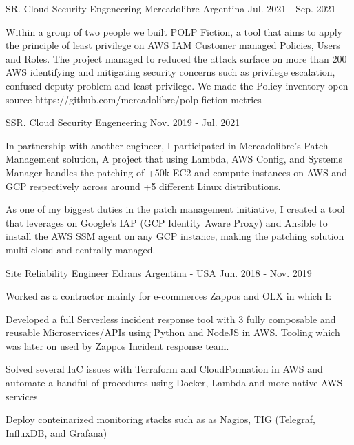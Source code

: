 \begin{cventries}
	\cventry
	{SR. Cloud Security Engeneering} %
	{Mercadolibre} %
	{Argentina} %
	{Jul. 2021 - Sep. 2021} %
	{
		\begin{cvitems} %
			\item {Within a group of two people we built POLP Fiction, a tool that aims to apply the principle of least privilege on AWS IAM Customer managed Policies, Users and Roles. The project managed to reduced the attack surface on more than 200 AWS identifying and mitigating security concerns such as privilege escalation, confused deputy problem and least privilege. We made the Policy inventory open source https://github.com/mercadolibre/polp-fiction-metrics}
		\end{cvitems}
	}
	\cventry
	{SSR. Cloud Security Engeneering} %
	{} %
	{} %
	{Nov. 2019 - Jul. 2021} %
	{
		\begin{cvitems} %
			\item {In partnership with another engineer, I participated in Mercadolibre's Patch Management solution, A project that using Lambda, AWS Config, and Systems Manager handles the patching of +50k EC2 and compute instances on AWS and GCP respectively across around +5 different Linux distributions.}
			\item {As one of my biggest duties in the patch management initiative, I created a tool that leverages on Google's IAP (GCP Identity Aware Proxy) and Ansible to install the AWS SSM agent on any GCP instance, making the patching solution multi-cloud and centrally managed.}
		\end{cvitems}
	}

	\cventry
	{Site Reliability Engineer} %
	{Edrans} %
	{Argentina - USA} %
	{Jun. 2018 - Nov. 2019} %
	{
		{Worked as a contractor mainly for e-commerces Zappos and OLX in which I:}
		\linebreak
		\begin{cvitems} %
			\item {Developed a full Serverless incident response tool with 3 fully composable and reusable Microservices/APIs using Python and NodeJS in AWS. Tooling which was later on used by Zappos Incident response team.}
			\item {Solved several IaC issues with Terraform and CloudFormation in AWS and automate a handful of procedures using Docker, Lambda and more native AWS services}
			\item {Deploy conteinarized monitoring stacks such as as Nagios, TIG (Telegraf, InfluxDB, and Grafana)}
		\end{cvitems}
	}


\end{cventries}
